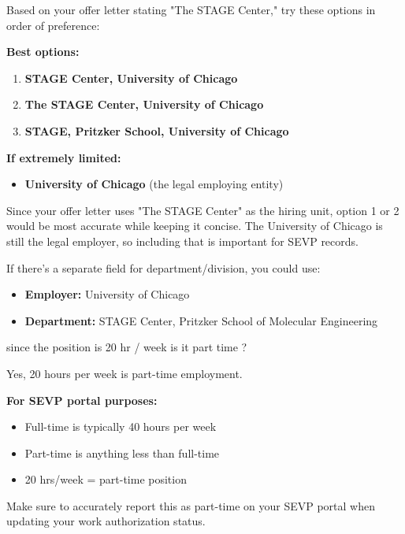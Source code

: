 \begin{botresponse}
Based on your offer letter stating "The STAGE Center," try these options in order of preference:

\textbf{Best options:}

\begin{enumerate}
\item \textbf{STAGE Center, University of Chicago}
\item \textbf{The STAGE Center, University of Chicago}
\item \textbf{STAGE, Pritzker School, University of Chicago}
\end{enumerate}

\textbf{If extremely limited:}

\begin{itemize}
\item \textbf{University of Chicago} (the legal employing entity)
\end{itemize}

Since your offer letter uses "The STAGE Center" as the hiring unit, option 1 or 2 would be most accurate while keeping it concise. The University of Chicago is still the legal employer, so including that is important for SEVP records.

If there's a separate field for department/division, you could use:

\begin{itemize}
\item \textbf{Employer:} University of Chicago
\item \textbf{Department:} STAGE Center, Pritzker School of Molecular Engineering
\end{itemize}
\end{botresponse}

\begin{userprompt}
since the position is 20 hr / week is it part time ?
\end{userprompt}

\begin{botresponse}
Yes, 20 hours per week is part-time employment.

\textbf{For SEVP portal purposes:}

\begin{itemize}
\item Full-time is typically 40 hours per week
\item Part-time is anything less than full-time
\item 20 hrs/week = part-time position
\end{itemize}

Make sure to accurately report this as part-time on your SEVP portal when updating your work authorization status.
\end{botresponse}

